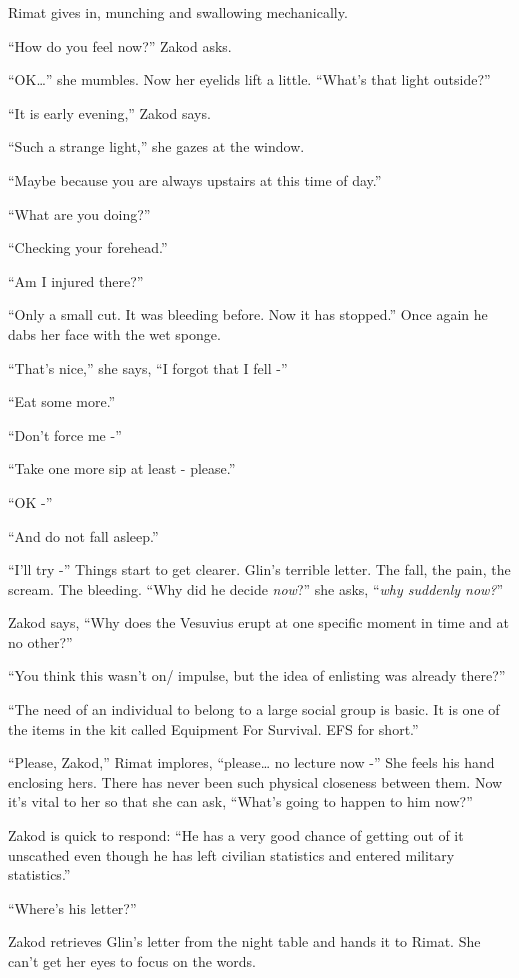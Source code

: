 \documentclass[twoside,11pt]{book}
\begin{document}
Rimat gives in, munching and swallowing mechanically.

``How do you feel now?'' Zakod asks.

``OK{\dots}'' she mumbles.  Now her eyelids lift a little. ``What's that light outside?''

``It is early evening,'' Zakod says.

``Such a strange light,'' she gazes at the window.

``Maybe because you are always upstairs at this time of day.''

``What are you doing?''

``Checking your forehead.''

``Am I injured there?''

``Only a small cut. It was bleeding before. Now it has stopped.'' Once again he dabs her face with the wet sponge.

``That's nice,'' she says, ``I forgot that I fell -''

``Eat some more.''

``Don't force me -''

``Take one more sip at least - please.''

``OK -''

``And do not fall asleep.''

``I'll try -'' Things start to get clearer. Glin's terrible letter. The fall, the pain, the scream. The bleeding.
``Why did he decide \textit{now}?'' she asks, ``\textit{why suddenly now?}''

Zakod says, ``Why does the Vesuvius erupt at one specific moment in time and at no other?''

``You think this wasn't on/ impulse, but the idea of enlisting was already there?''

``The need of an individual to belong to a large social group is basic. It is one of the items in the kit called
Equipment For Survival. EFS for short.''

``Please, Zakod,'' Rimat implores, ``please{\dots} no lecture now -'' She feels his hand enclosing hers. There has
never been such physical closeness between them. Now it's vital to her so that she can ask, ``What's
going to happen to him now?''

Zakod is quick to respond: ``He has a very good chance of getting out of it unscathed even though he has
left civilian statistics and entered military statistics.''

``Where's his letter?''

Zakod  retrieves Glin's letter from the night table and hands it to Rimat. She can't get her eyes to focus on the
words.
\end{document}
